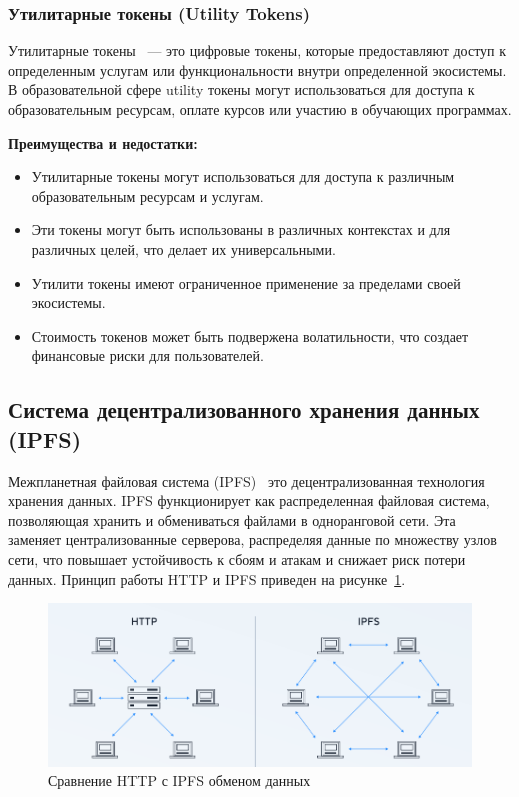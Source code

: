 \subsubsection{Утилитарные токены (Utility Tokens)}

Утилитарные токены~\cite{bib:what_is_utt} --- это цифровые токены, которые предоставляют доступ к определенным услугам или функциональности внутри определенной экосистемы. В образовательной сфере utility токены могут использоваться для доступа к образовательным ресурсам, оплате курсов или участию в обучающих программах.

\textbf{Преимущества и недостатки:}
\begin{itemize}
    \item Утилитарные токены могут использоваться для доступа к различным образовательным ресурсам и услугам.
    \item Эти токены могут быть использованы в различных контекстах и для различных целей, что делает их универсальными.
    \item Утилити токены имеют ограниченное применение за пределами своей экосистемы.
    \item Стоимость токенов может быть подвержена волатильности, что создает финансовые риски для пользователей.
\end{itemize}

\subsection{Система децентрализованного хранения данных (IPFS)}

Межпланетная файловая система (IPFS)~\cite{bib:ipfs} это децентрализованная технология хранения данных. IPFS функционирует как распределенная файловая система, позволяющая хранить и обмениваться файлами в одноранговой сети. Эта заменяет централизованные серверова, распределяя данные по множеству узлов сети, что повышает устойчивость к сбоям и атакам и снижает риск потери данных. Принцип работы HTTP и IPFS приведен на рисунке~\ref{fig:http_vs_ipfs}.

\begin{figure}[H]   
	\centering
	\includegraphics[width=\textwidth]{images/1.http_vs_ipfs.png}
	\parskip=6pt
	\caption{Сравнение HTTP с IPFS обменом данных}
	\label{fig:http_vs_ipfs}
\end{figure}

